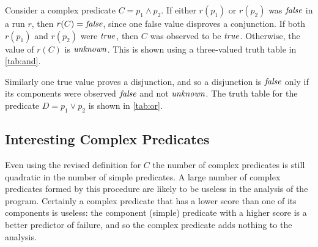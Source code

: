 Consider a complex predicate $C = p_1 \wedge p_2$.  If either $r(p_1)$ or $r(p_2)$ was $\mathit{false}$ in a run $r$, then $r(C) = \mathit{false}$, since one false value disproves a conjunction.  If both $r(p_1)$ and $r(p_2)$ were $\mathit{true}$, then $C$ was observed to be $\mathit{true}$.  Otherwise, the value of $r(C)$ is $\mathit{unknown}$. This is shown using a three-valued truth table in \autoref{tab:and}.

Similarly one true value proves a disjunction, and so a disjunction is $\mathit{false}$ only if its components were observed $\mathit{false}$ and not $\mathit{unknown}$.  The truth table for the predicate $D = p_1 \vee p_2$ is shown in \autoref{tab:or}.

\begin{table}
  \caption{Three-valued truth tables for complex predicates}
  \label{tab:truth-tables}
  \hfill
  \hfill
  \hspace*{\fill}
\end{table}

\subsection{Interesting Complex Predicates}
Even using the revised definition for $C$ the number of complex predicates is still quadratic in the number of simple predicates.  A large number of complex predicates formed by this procedure are likely to be useless in the analysis of the program.  Certainly a complex predicate that has a lower score than one of its components is useless: the component (simple) predicate with a higher score is a better predictor of failure, and so the complex predicate adds nothing to the analysis.

